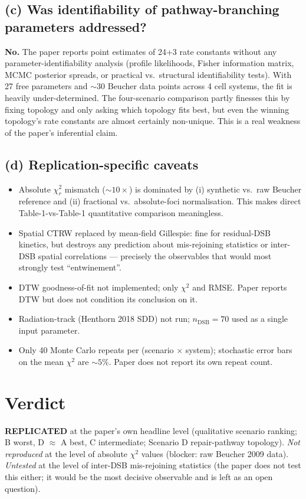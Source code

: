 \documentclass[11pt]{article}
\begin{document}
\subsection*{(c) Was identifiability of pathway-branching parameters
addressed?}
\textbf{No.} The paper reports point estimates of 24+3 rate
constants without any parameter-identifiability analysis (profile
likelihoods, Fisher information matrix, MCMC posterior spreads, or
practical vs.\ structural identifiability tests). With 27 free
parameters and $\sim\!30$ Beucher data points across 4 cell systems,
the fit is heavily under-determined. The four-scenario comparison
partly finesses this by fixing topology and only asking which
topology fits best, but even the winning topology's rate constants
are almost certainly non-unique. This is a real weakness of the
paper's inferential claim.

\subsection*{(d) Replication-specific caveats}
\begin{itemize}[leftmargin=*, itemsep=1pt]
  \item Absolute $\chi^2_r$ mismatch (${\sim}10\times$) is dominated
    by (i) synthetic vs.\ raw Beucher reference and (ii) fractional
    vs.\ absolute-foci normalisation. This makes direct
    Table-1-vs-Table-1 quantitative comparison meaningless.
  \item Spatial CTRW replaced by mean-field Gillespie: fine for
    residual-DSB kinetics, but destroys any prediction about
    mis-rejoining statistics or inter-DSB spatial correlations ---
    precisely the observables that would most strongly test
    ``entwinement''.
  \item DTW goodness-of-fit not implemented; only $\chi^2$ and RMSE.
    Paper reports DTW but does not condition its conclusion on it.
  \item Radiation-track (Henthorn 2018 SDD) not run; $n_{\text{DSB}}=70$
    used as a single input parameter.
  \item Only 40 Monte Carlo repeats per (scenario $\times$ system);
    stochastic error bars on the mean $\chi^2$ are $\sim\!5\%$.
    Paper does not report its own repeat count.
\end{itemize}

\section{Verdict}
\textbf{REPLICATED} at the paper's own headline level (qualitative
scenario ranking; B worst, D $\approx$ A best, C intermediate;
Scenario D repair-pathway topology). \emph{Not reproduced} at the
level of absolute $\chi^2$ values (blocker: raw Beucher 2009 data).
\emph{Untested} at the level of inter-DSB mis-rejoining statistics
(the paper does not test this either; it would be the most decisive
observable and is left as an open question).
\end{document}
